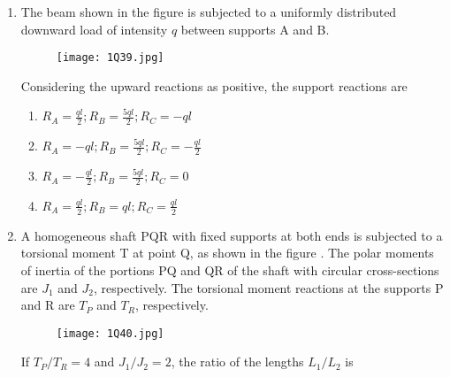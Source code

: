 \documentclass[journal,12pt,onecolumn]{article}
\theoremstyle{remark}
\begin{document}
\begin{enumerate}
    \hfill{}
    \begin{enumerate}
        \item {}-; -; -; -
        \item {}-; -; -; -
        \item {}-; -; -; -
        \item {}-; -; -; -
    \end{enumerate}
    
    \item The beam shown in the figure  is subjected to a uniformly distributed downward load of intensity $q$ between supports A and B.
    \begin{figure}[H]
        \centering
        \texttt{[image: 1Q39.jpg]}
        \caption{}
        \label{fig:q39}
    \end{figure}
    Considering the upward reactions as positive, the support reactions are
    
    \hfill{}
    \begin{enumerate}
        \item $R_A = \frac{ql}{2}; R_B = \frac{5ql}{2}; R_C = -ql$
        \item $R_A = -ql; R_B = \frac{5ql}{2}; R_C = -\frac{ql}{2}$
        \item $R_A = -\frac{ql}{2}; R_B = \frac{5ql}{2}; R_C = 0$
        \item $R_A = \frac{ql}{2}; R_B = ql; R_C = \frac{ql}{2}$
    \end{enumerate}
    
    \item A homogeneous shaft PQR with fixed supports at both ends is subjected to a torsional moment T at point Q, as shown in the figure . The polar moments of inertia of the portions PQ and QR of the shaft with circular cross-sections are $J_1$ and $J_2$, respectively. The torsional moment reactions at the supports P and R are $T_P$ and $T_R$, respectively.
    \begin{figure}[H]
        \centering
        \texttt{[image: 1Q40.jpg]}
        \caption{}
        \label{fig:q40}
    \end{figure}
    If $T_P/T_R = 4$ and $J_1/J_2 = 2$, the ratio of the lengths $L_1/L_2$ is
    

\end{enumerate}
\end{document}
